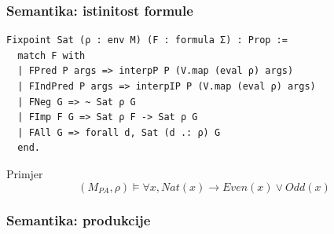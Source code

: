 \documentclass{beamer}
\begin{document}
\begin{frame}[fragile]
  \frametitle{Semantika: istinitost formule}
\begin{verbatim}
Fixpoint Sat (ρ : env M) (F : formula Σ) : Prop :=
  match F with
  | FPred P args => interpP P (V.map (eval ρ) args)
  | FIndPred P args => interpIP P (V.map (eval ρ) args)
  | FNeg G => ~ Sat ρ G
  | FImp F G => Sat ρ F -> Sat ρ G
  | FAll G => forall d, Sat (d .: ρ) G
  end.
\end{verbatim}
  \begin{block}{Primjer}
    \[
      (M_{\mathit{PA}}, \rho) \vDash \forall x, \mathit{Nat}(x) \rightarrow \mathit{Even}(x) \lor \mathit{Odd}(x)
    \]
  \end{block}
\end{frame}

\begin{frame}
  \frametitle{Semantika: produkcije}
  
\end{frame}
\end{document}
